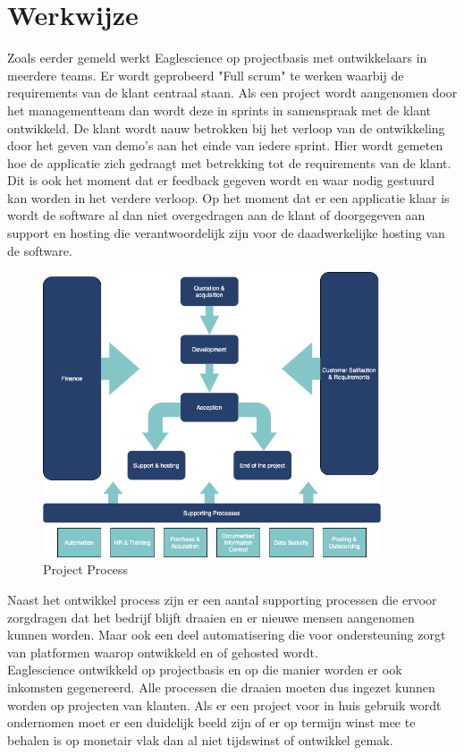 \section{Werkwijze}\label{sec:werkwijze}
Zoals eerder gemeld werkt Eaglescience op projectbasis met ontwikkelaars in meerdere teams.
Er wordt geprobeerd "Full scrum" te werken waarbij de requirements van de klant centraal staan.
Als een project wordt aangenomen door het managementteam dan wordt deze in sprints in samenspraak met de klant ontwikkeld.
De klant wordt nauw betrokken bij het verloop van de ontwikkeling door het geven van demo's aan het einde van iedere sprint.
Hier wordt gemeten hoe de applicatie zich gedraagt met betrekking tot de requirements van de klant.
Dit is ook het moment dat er feedback gegeven wordt en waar nodig gestuurd kan worden in het verdere verloop.
Op het moment dat er een applicatie klaar is wordt de software al dan niet overgedragen aan de klant of doorgegeven aan support en hosting die verantwoordelijk zijn voor de daadwerkelijke hosting van de software.
\begin{figure}[bth]
\myfloatalign
\includegraphics[width=10cm]{gfx/ProcessFlow}
\caption{Project Process}
\label{fig:Project Process}
\end{figure}

Naast het ontwikkel process zijn er een aantal supporting processen die ervoor zorgdragen dat het bedrijf blijft draaien en er nieuwe mensen aangenomen kunnen worden.
Maar ook een deel automatisering die voor ondersteuning zorgt van platformen waarop ontwikkeld en of gehosted wordt.\\
Eaglescience ontwikkeld op projectbasis en op die manier worden er ook inkomsten gegenereerd.
Alle processen die draaien moeten dus ingezet kunnen worden op projecten van klanten.
Als er een project voor in huis gebruik wordt ondernomen moet er een duidelijk beeld zijn of er op termijn winst mee te behalen is op monetair vlak dan al niet tijdswinst of ontwikkel gemak.

